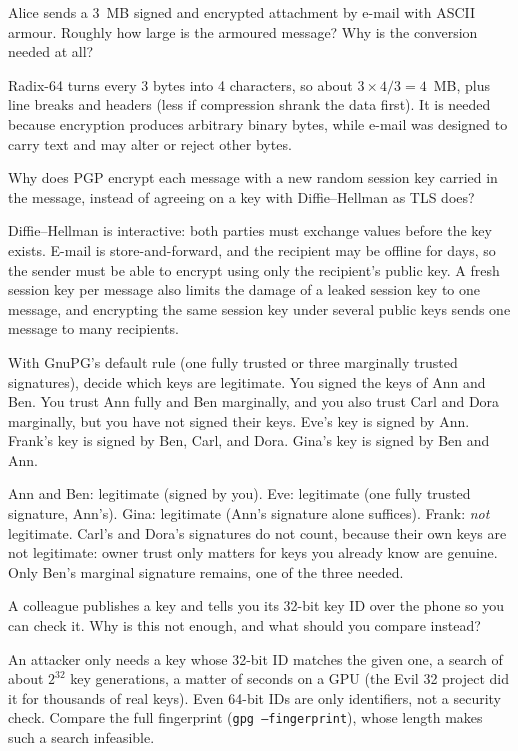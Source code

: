 \begin{exercise}
Alice sends a 3~MB signed and encrypted attachment by e-mail with ASCII armour. Roughly how large is the armoured message? Why is the conversion needed at all?
\end{exercise}
\begin{solution}
Radix-64 turns every 3 bytes into 4 characters, so about $3 \times 4/3 = 4$~MB, plus line breaks and headers (less if compression shrank the data first). It is needed because encryption produces arbitrary binary bytes, while e-mail was designed to carry text and may alter or reject other bytes.
\end{solution}

\begin{exercise}
Why does PGP encrypt each message with a new random session key carried in the message, instead of agreeing on a key with Diffie--Hellman as TLS does?
\end{exercise}
\begin{solution}
Diffie--Hellman is interactive: both parties must exchange values before the key exists. E-mail is store-and-forward, and the recipient may be offline for days, so the sender must be able to encrypt using only the recipient's public key. A fresh session key per message also limits the damage of a leaked session key to one message, and encrypting the same session key under several public keys sends one message to many recipients.
\end{solution}

\begin{exercise}
With GnuPG's default rule (one fully trusted or three marginally trusted signatures), decide which keys are legitimate. You signed the keys of Ann and Ben. You trust Ann fully and Ben marginally, and you also trust Carl and Dora marginally, but you have not signed their keys. Eve's key is signed by Ann. Frank's key is signed by Ben, Carl, and Dora. Gina's key is signed by Ben and Ann.
\end{exercise}
\begin{solution}
Ann and Ben: legitimate (signed by you). Eve: legitimate (one fully trusted signature, Ann's). Gina: legitimate (Ann's signature alone suffices). Frank: \emph{not} legitimate. Carl's and Dora's signatures do not count, because their own keys are not legitimate: owner trust only matters for keys you already know are genuine. Only Ben's marginal signature remains, one of the three needed.
\end{solution}

\begin{exercise}
A colleague publishes a key and tells you its 32-bit key ID over the phone so you can check it. Why is this not enough, and what should you compare instead?
\end{exercise}
\begin{solution}
An attacker only needs a key whose 32-bit ID matches the given one, a search of about $2^{32}$ key generations, a matter of seconds on a GPU (the Evil 32 project did it for thousands of real keys). Even 64-bit IDs are only identifiers, not a security check. Compare the full fingerprint (\texttt{gpg --fingerprint}), whose length makes such a search infeasible.
\end{solution}
